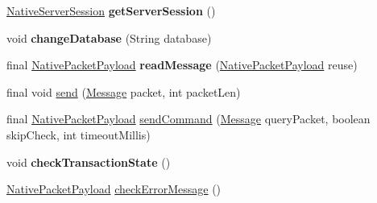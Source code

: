 \begin{DoxyCompactItemize}
\item 
\mbox{\label{classcom_1_1mysql_1_1cj_1_1protocol_1_1a_1_1_native_protocol_a160dda876f487328e007c9c96b155c6b}} 
\mbox{\hyperlink{classcom_1_1mysql_1_1cj_1_1protocol_1_1a_1_1_native_server_session}{Native\+Server\+Session}} {\bfseries get\+Server\+Session} ()
\item 
\mbox{\label{classcom_1_1mysql_1_1cj_1_1protocol_1_1a_1_1_native_protocol_a565743e2d31afb5137925eb2c372d344}} 
void {\bfseries change\+Database} (String database)
\item 
\mbox{\label{classcom_1_1mysql_1_1cj_1_1protocol_1_1a_1_1_native_protocol_a3729eaeefbb45e1742184e1902ed708b}} 
final \mbox{\hyperlink{classcom_1_1mysql_1_1cj_1_1protocol_1_1a_1_1_native_packet_payload}{Native\+Packet\+Payload}} {\bfseries read\+Message} (\mbox{\hyperlink{classcom_1_1mysql_1_1cj_1_1protocol_1_1a_1_1_native_packet_payload}{Native\+Packet\+Payload}} reuse)
\item 
final void \mbox{\hyperlink{classcom_1_1mysql_1_1cj_1_1protocol_1_1a_1_1_native_protocol_ab8fc56f3c8cbc5abba6cb7c485f534f1}{send}} (\mbox{\hyperlink{interfacecom_1_1mysql_1_1cj_1_1protocol_1_1_message}{Message}} packet, int packet\+Len)
\item 
final \mbox{\hyperlink{classcom_1_1mysql_1_1cj_1_1protocol_1_1a_1_1_native_packet_payload}{Native\+Packet\+Payload}} \mbox{\hyperlink{classcom_1_1mysql_1_1cj_1_1protocol_1_1a_1_1_native_protocol_ad0ee17f4275b06e46244520a03a6afdd}{send\+Command}} (\mbox{\hyperlink{interfacecom_1_1mysql_1_1cj_1_1protocol_1_1_message}{Message}} query\+Packet, boolean skip\+Check, int timeout\+Millis)
\item 
\mbox{\label{classcom_1_1mysql_1_1cj_1_1protocol_1_1a_1_1_native_protocol_a35b9f6130a7d43685fc77c67f99ea23e}} 
void {\bfseries check\+Transaction\+State} ()
\item 
\mbox{\hyperlink{classcom_1_1mysql_1_1cj_1_1protocol_1_1a_1_1_native_packet_payload}{Native\+Packet\+Payload}} \mbox{\hyperlink{classcom_1_1mysql_1_1cj_1_1protocol_1_1a_1_1_native_protocol_a7c2558549dd31879ef27e087724c3c44}{check\+Error\+Message}} ()
\item 

\end{DoxyCompactItemize}
